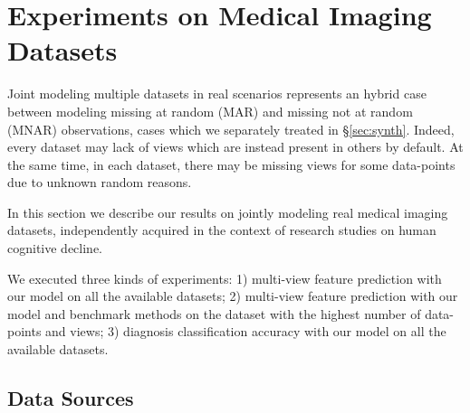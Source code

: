 \section{Experiments on Medical Imaging Datasets}
\label{sec:real}

% 
% 
% 

Joint modeling multiple datasets in real scenarios represents an hybrid case between modeling missing at random (MAR) and missing not at random (MNAR) observations, cases which we separately treated in \S\ref{sec:synth}.
Indeed, every dataset may lack of views which are instead present in others by default.
At the same time, in each dataset, there may be missing views for some data-points due to unknown random reasons.

In this section we describe our results on jointly modeling real medical imaging datasets, independently acquired in the context of research studies on human cognitive decline.

We executed three kinds of experiments:
1) multi-view feature prediction with our model on all the available datasets;
2) multi-view feature prediction with our model and benchmark methods on the dataset with the highest number of data-points and views;
3) diagnosis classification accuracy with our model on all the available datasets.

\subsection{Data Sources}
\label{ssec:datasets}

